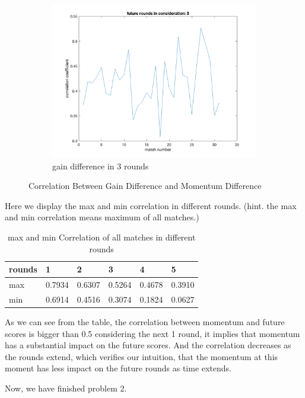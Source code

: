\begin{figure}[htbp]
    \begin{subfigure}[b]{0.34\textwidth}
        \includegraphics[width=\linewidth]{mainmatter/photos/momen_3points_cor.png}
        \caption{gain difference in 3 rounds}
    \end{subfigure}
    \caption{Correlation Between Gain Difference and Momentum Difference}
    \label{fig:Correlation}
\end{figure}

Here we display the max and min correlation in different rounds.
(hint. the max and min correlation means maximum of all matches.)

\begin{table}[!ht]
    \centering
    \begin{tabular}{|l|l|l|l|l|l|}
    \hline
        rounds & 1 & 2 & 3 & 4 & 5 \\ \hline
        max & 0.7934 & 0.6307 & 0.5264 & 0.4678 & 0.3910 \\ \hline
        min & 0.6914 & 0.4516 & 0.3074 & 0.1824 & 0.0627 \\ \hline
    \end{tabular}
    \caption{max and min Correlation of all matches in different rounds}
    \label{fig:maxmin Correlation}
\end{table}

As we can see from the table, the correlation between momentum and future scores is bigger
than 0.5 considering the next 1 round, it implies that momentum has a substantial impact on the future scores.
And the correlation decreases as the rounds extend, which verifies our intuition, that
the momentum at this moment has less impact on the future rounds as time extends.

Now, we have finished problem 2.